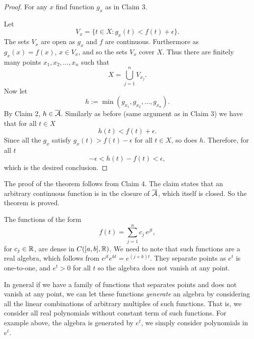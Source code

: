 \begin{proof}
For any $x$ find function $g_x$ as in Claim 3.

Let
\begin{equation*}
V_x = \bigl\{ t \in X : g_x(t) < f(t) + \epsilon \bigr\}.
\end{equation*}
The sets $V_x$ are open as $g_x$ and $f$ are continuous.
Furthermore as $g_x(x) = f(x)$, $x \in V_x$, and so the sets $V_x$ cover $X$.  Thus
there
are finitely many points $x_1,x_2,\ldots,x_n$ such that
\begin{equation*}
X = \bigcup_{j=1}^n V_{x_j} .
\end{equation*}
Now let
\begin{equation*}
h := \min(g_{x_1},g_{x_2},\ldots,g_{x_n}) .
\end{equation*}
By Claim 2, $h \in \overline{{\mathcal{A}}}$.  Similarly as before (same argument as in
Claim 3) we have that for all
$t \in X$
\begin{equation*}
h(t) < f(t) + \epsilon .
\end{equation*}
Since all the $g_x$ satisfy $g_x(t) > f(t) - \epsilon$ for all $t \in X$, so does $h$.
Therefore, for all $t$
\begin{equation*}
-\epsilon < h(t) - f(t) < \epsilon ,
\end{equation*}
which is the desired conclusion.
\end{proof}

The proof of the theorem follows from Claim 4.  The claim states that an
arbitrary continuous function is in the closure of $\overline{{\mathcal{A}}}$,
which itself is
closed.  So the theorem is proved.

\begin{example}
The functions of the form
\begin{equation*}
f(t) = \sum_{j=1}^n c_j \, e^{jt},
\end{equation*}
for $c_j \in {\mathbb{R}}$,
are dense in $C([a,b],{\mathbb{R}})$.  We need to note that such functions are a real
algebra, which follows from $e^{jt} e^{kt} = e^{(j+k)t}$.  They separate
points as $e^t$ is one-to-one, and $e^t > 0$ for all $t$ so the algebra
does not vanish at any point.
\end{example}

In general if we have a family of functions that separates points and does
not vanish at any point, we can let these functions
\emph{generate}
an algebra
by considering all the linear combinations of arbitrary multiples of such
functions.  That is, we consider all real polynomials without constant term
of such functions.  For example above,
the algebra is generated by $e^t$, we simply
consider polynomials in $e^t$.

